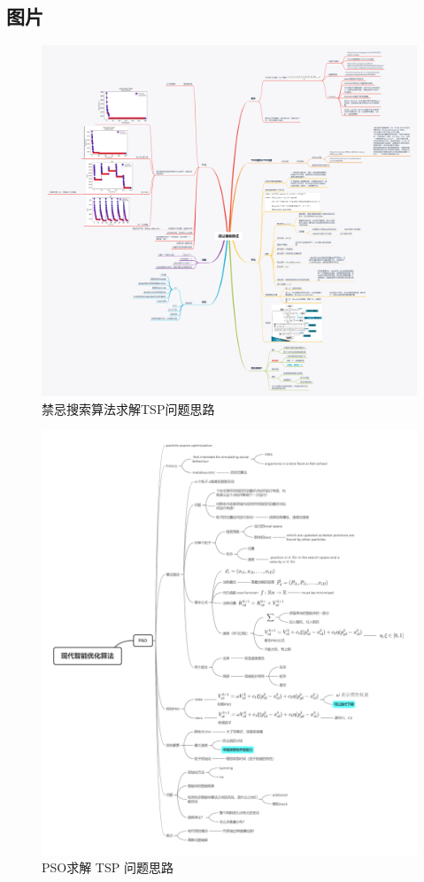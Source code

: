 \documentclass[lang=cn,11pt]{elegantpaper}
\begin{document}
\subsection{图片}
\begin{figure}[ht]
  \centering
  \includegraphics[width=1\textwidth]{figure/禁忌搜索算法.png} %
  \caption{禁忌搜索算法求解TSP问题思路} %
  \label{img:禁忌搜索算法} %
\end{figure}

\begin{figure}[ht]
  \centering
  \includegraphics[width=1\textwidth]{figure/PSO/现代智能优化算法——PSO笔记.png} %
  \caption{PSO求解 TSP 问题思路} %
  \label{img:PSO笔记} %
\end{figure}
\end{document}
